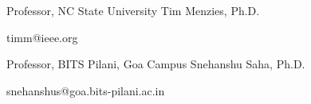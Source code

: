 
\begin{cventries}
\cventry
        {Professor, NC State University}
        {Tim Menzies, Ph.D.}
        {}
        {}
        {
            \begin{cvitems}
                \item timm@ieee.org
            \end{cvitems}
        }
    \cventry
        {Professor, BITS Pilani, Goa Campus}
        {Snehanshu Saha, Ph.D.}
        {}
        {}
        {
            \begin{cvitems}
                \item snehanshus@goa.bits-pilani.ac.in 
            \end{cvitems}
        }
\end{cventries}